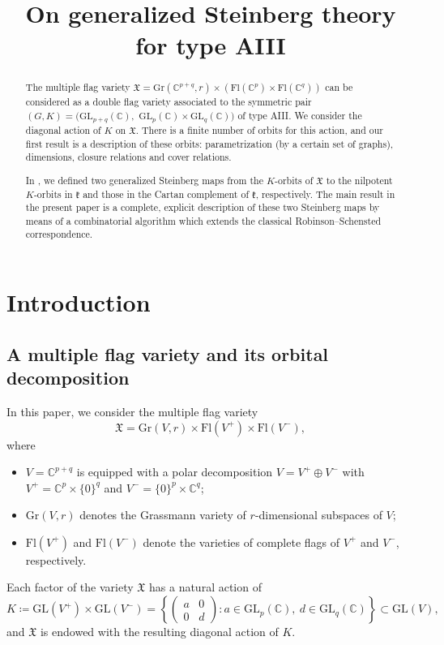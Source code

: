 \documentclass[ALCO,Unicode]{cedram}
\title[On generalized Steinberg theory for type AIII]{On generalized Steinberg theory for type AIII}
\author[\initial{L.} Fresse]{\firstname{Lucas} \lastname{Fresse}}
\author[\initial{K.} Nishiyama]{\firstname{Kyo} \lastname{Nishiyama}}
\newcommand{\Xfv}{\mathfrak{X}}
\newcommand{\Grass}{\mathrm{Gr}}
\newcommand{\Flags}{\mathrm{Fl}}
\newcommand{\GL}{\mathrm{GL}}
\newcommand{\mC}{\mathbb{C}}
\begin{document}
\begin{abstract}
The multiple flag variety
$\mathfrak{X}=\mathrm{Gr}(\mathbb{C}^{p+q},r)\times(\mathrm{Fl}(\mathbb{C}^p)\times\mathrm{Fl}(\mathbb{C}^q))$
can be considered as a double flag variety associated to the symmetric pair $(G,K)=(\mathrm{GL}_{p+q}(\mathbb{C}),$ $\mathrm{GL}_{p}(\mathbb{C})\times \mathrm{GL}_{q}(\mathbb{C}))$ of type AIII.
We consider the diagonal action of $K$ on $\mathfrak{X}$.
There is a finite number of orbits for this action, and our first result is a description of these orbits: parametrization (by a certain set of graphs), dimensions, closure relations and cover relations.

In \cite{FN2}, we defined two generalized Steinberg maps from the $K$-orbits of $\mathfrak{X}$ to the nilpotent $K$-orbits in $\mathfrak{k}$ and those in the Cartan complement of $\mathfrak{k}$, respectively.
The main result in the present paper is a complete, explicit description of these two Steinberg maps
by means of a combinatorial algorithm
which extends the classical Robinson--Schensted correspondence.
\end{abstract}


\maketitle






\section{Introduction}

\subsection{A multiple flag variety and its orbital decomposition}
\label{section-1.1}
In this paper, we consider the multiple flag variety
\begin{equation}
\label{equation-dfv}
\Xfv=\Grass(V,r)\times \Flags(V^+)\times \Flags(V^-),
\end{equation}
where
\begin{itemize}
\item $V=\mC^{p+q}$ is equipped with a polar decomposition $V=V^+\oplus V^-$ with $V^+=\mC^p\times\{0\}^q$ and $V^-=\{0\}^p\times \mC^q$;
\item $\Grass(V,r)$ denotes the Grassmann variety of $r$-dimensional subspaces of $V$;
\item $\Flags(V^+)$ and $\Flags(V^-)$ denote the varieties of complete flags of $V^+$ and $V^-$, respectively.
\end{itemize}
Each factor of the variety $\Xfv$ has a natural action of
\[
K\coloneqq \GL(V^+)\times \GL(V^-)=\left\{\begin{pmatrix} a & 0\\ 0 & d \end{pmatrix}:a\in\GL_p(\mC),\ d\in\GL_q(\mC)\right\}\subset\GL(V),
\]
and $\Xfv$ is endowed with the resulting diagonal action of $K$.
\end{document}
